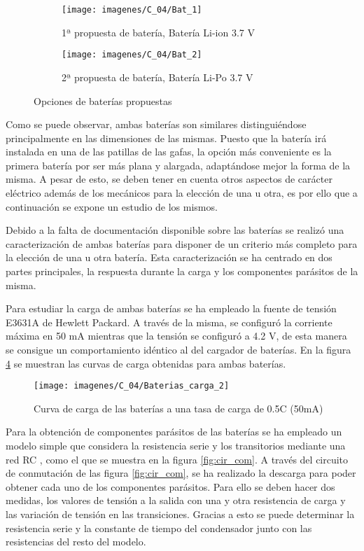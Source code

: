 \begin{figure}[!ht]
\center
\begin{subfigure}[b]{0.47\textwidth}
\center
\texttt{[image: imagenes/C\_04/Bat\_1]}
\caption{1ª propuesta de batería, Batería Li-ion 3.7 V}
\label{fig:bat_1}
\end{subfigure}
\begin{subfigure}[b]{0.47\textwidth}
\center
\texttt{[image: imagenes/C\_04/Bat\_2]}
\caption{2ª propuesta de batería, Batería Li-Po 3.7 V}
\label{fig:bat_2}
\end{subfigure}
\caption{Opciones de baterías propuestas}

\end{figure}

Como se puede observar, ambas baterías son similares distinguiéndose principalmente en las dimensiones de las mismas. Puesto que la batería irá instalada en una de las patillas de las gafas, la opción más conveniente es la primera batería por ser más plana y alargada, adaptándose mejor la forma de la misma. A pesar de esto, se deben tener en cuenta otros aspectos de carácter eléctrico además de los mecánicos para la elección de una u otra, es por ello que a continuación se expone un estudio de los mismos. 

Debido a la falta de documentación disponible sobre las baterías se realizó una caracterización de ambas baterías para disponer de un criterio más completo para la elección de una u otra batería. Esta  caracterización se ha centrado en dos partes principales, la respuesta durante la carga y los componentes parásitos de la misma.

Para estudiar la carga de ambas baterías se ha empleado la fuente de tensión E3631A de Hewlett Packard. A través de la misma, se configuró la corriente máxima en 50 mA mientras que la tensión se configuró a 4.2 V, de esta manera se consigue un comportamiento idéntico al del cargador de baterías. En la figura \ref{fig:bat_car} se muestran las curvas de carga obtenidas para ambas baterías. 

\begin{figure}[!ht]
	\center
	\texttt{[image: imagenes/C\_04/Baterias\_carga\_2]}
	\caption{Curva de carga de las baterías a una tasa de carga de 0.5C (50mA) }
	\label{fig:bat_car}
\end{figure}

Para la obtención de componentes parásitos de las baterías se ha empleado un modelo simple que considera la resistencia serie y los transitorios mediante una red RC \cite{Chen_2006}, como el que se muestra en la figura \ref{fig:cir_com}. A través del circuito de conmutación de las figura \ref{fig:cir_com}, se ha realizado la descarga para poder obtener cada uno de los componentes parásitos. Para ello se deben hacer dos medidas, los valores de tensión a la salida con una y otra resistencia de carga y las variación de tensión en las transiciones. Gracias a esto se puede determinar la resistencia serie y la constante de tiempo del condensador junto con las resistencias del resto del modelo.

